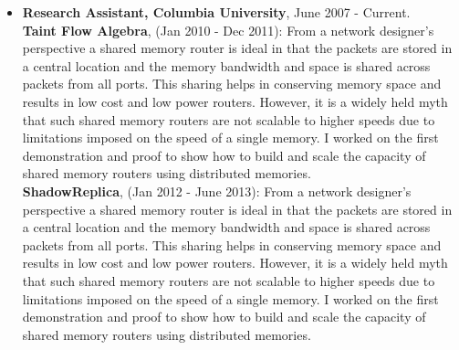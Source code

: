 \documentclass[10pt,a4]{article}
\begin{document}
\begin{small}
\begin{itemize}
\vspace{0.1cm}
\item  {\bf Research Assistant, Columbia University}, June 2007 - Current. \\
%
%   
  {\bf Taint Flow Algebra}, (Jan 2010 - Dec 2011): From a network designer's
  perspective a shared memory router is ideal in that the packets are stored in
  a central location and the memory bandwidth and space is shared across packets
  from all ports. This sharing helps in conserving memory space and results in
  low cost and low power routers. However, it is a widely held myth that such
  shared memory routers are not scalable to higher speeds due to limitations
  imposed on the speed of a single memory. I worked on the first demonstration
  and proof to show how to build and scale the capacity of shared memory routers
  using distributed memories. \\
%
  {\bf ShadowReplica}, (Jan 2012 - June 2013): From a network designer's
  perspective a shared memory router is ideal in that the packets are stored in
  a central location and the memory bandwidth and space is shared across packets
  from all ports. This sharing helps in conserving memory space and results in
  low cost and low power routers. However, it is a widely held myth that such
  shared memory routers are not scalable to higher speeds due to limitations
  imposed on the speed of a single memory. I worked on the first demonstration
  and proof to show how to build and scale the capacity of shared memory routers
  using distributed memories. \\

\end{itemize}
\end{small}
\end{document}
